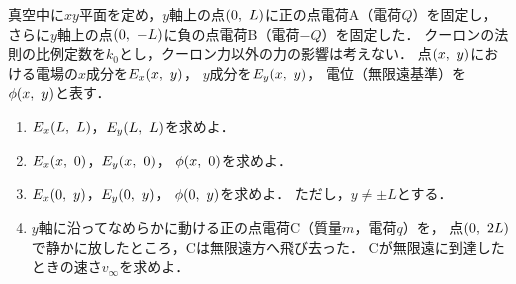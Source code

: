 \documentclass[../../../uem_phy_std_q.tex]{subfiles}
\begin{document}
    真空中に$xy$平面を定め，$y$軸上の点$(0,\hspace{3.4pt} L)$に正の点電荷A（電荷$Q$）を固定し，%
    さらに$y$軸上の点$(0,\hspace{3.4pt} -L)$に負の点電荷B（電荷$-Q$）を固定した．%
    クーロンの法則の比例定数を$k_0$とし，クーロン力以外の力の影響は考えない．%
    点$(x,\hspace{3.4pt} y)$における電場の$x$成分を$E_x(x,\hspace{3.4pt} y)$，%
    $y$成分を$E_y(x,\hspace{3.4pt} y)$，%
    電位（無限遠基準）を$\phi(x,\hspace{3.4pt} y)$と表す．

    \begin{enumerate}
        \item $E_x(L,\hspace{3.4pt} L)$，$E_y(L,\hspace{3.4pt} L)$を求めよ．
        \item $E_x(x,\hspace{3.4pt} 0)$，$E_y(x,\hspace{3.4pt} 0)$，%
            $\phi(x,\hspace{3.4pt} 0)$を求めよ．
        \item $E_x(0,\hspace{3.4pt} y)$，$E_y(0,\hspace{3.4pt} y)$，%
            $\phi(0,\hspace{3.4pt} y)$を求めよ．%
            ただし，$y \neq \pm L$とする．
        \item $y$軸に沿ってなめらかに動ける正の点電荷C（質量$m$，電荷$q$）を，%
            点$(0,\hspace{3.4pt} 2L)$で静かに放したところ，Cは無限遠方へ飛び去った．%
            Cが無限遠に到達したときの速さ$v_\infty$を求めよ．
    \end{enumerate}
\end{document}
